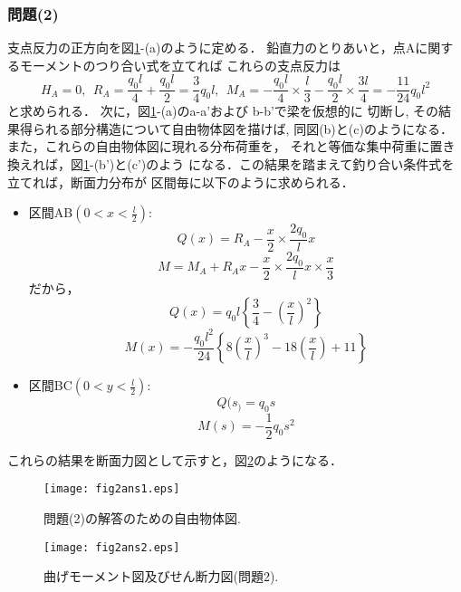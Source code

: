 \documentclass[10pt,a4j]{jarticle}
\begin{document}
\subsubsection*{問題(2)}
支点反力の正方向を図\ref{fig:fig2_1}-(a)のように定める．
鉛直力のとりあいと，点Aに関するモーメントのつり合い式を立てれば
これらの支点反力は
\begin{equation}
	H_A=0, \ \
	R_A=\frac{q_0l}{4}+\frac{q_0l}{2}=\frac{3}{4}q_0l, \ \ 
	M_A=- \frac{q_0l}{4}\times \frac{l}{3} -\frac{q_0l}{2}\times \frac{3l}{4} =-\frac{11}{24}q_0l^2
\end{equation}
と求められる．
次に，図\ref{fig:fig2_1}-(a)のa-a'および b-b'で梁を仮想的に
切断し, その結果得られる部分構造について自由物体図を描けば, 
同図(b)と(c)のようになる．また，これらの自由物体図に現れる分布荷重を，
それと等価な集中荷重に置き換えれば，図\ref{fig:fig2_1}-(b')と(c')のよう
になる．この結果を踏まえて釣り合い条件式を立てれば，断面力分布が
区間毎に以下のように求められる．
\begin{itemize}
\item
	区間AB$\left( 0<x<\frac{l}{2}\right)$:\\
	\begin{equation}
		Q(x)=R_A-\frac{x}{2}\times \frac{2q_0}{l}x 
	\end{equation}
	\begin{equation}
		M=M_A+R_Ax-
		\frac{x}{2}\times
		\frac{2q_0}{l}x \times\frac{x}{3}
	\end{equation}
	だから，
	\begin{equation}
		Q(x) =
		q_0l \left\{ 
			\frac{3}{4} -\left( \frac{x}{l} \right)^2
		\right\}
	\end{equation}
	\begin{equation}
		M(x) =
		-\frac{q_0l^2}{24} \left\{ 
			8\left( \frac{x}{l} \right)^3
			-18 \left(\frac{x}{l}\right) 
			+11
		\right\}
	\end{equation}
\item
	区間BC$\left( 0<y<\frac{l}{2}\right)$:\\
	\begin{equation}
		Q(s_)=q_0s
	\end{equation}
	\begin{equation}
		M(s)=-\frac{1}{2}q_0s^2 
	\end{equation}
\end{itemize}
これらの結果を断面力図として示すと，図\ref{fig:fig2_2}のようになる．
\begin{figure}[h]
	\begin{center}
	\texttt{[image: fig2ans1.eps]} 
	\end{center}
	\caption{問題(2)の解答のための自由物体図.} 
	\label{fig:fig2_1}
\end{figure}
\begin{figure}[h]
	\begin{center}
	\texttt{[image: fig2ans2.eps]} 
	\end{center}
	\caption{曲げモーメント図及びせん断力図(問題2).} 
	\label{fig:fig2_2}
\end{figure}
\end{document}
